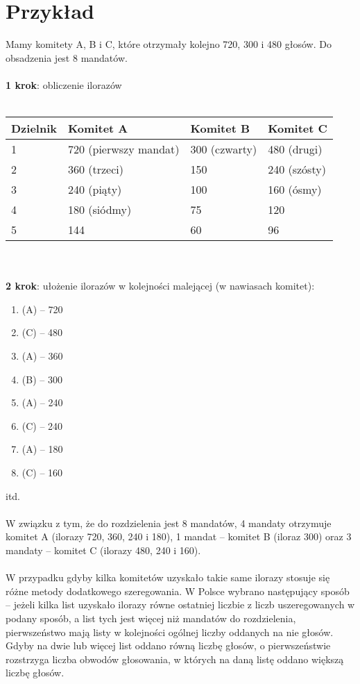 \documentclass[12pt,a4paper,titlepage]{report}
\begin{document}
\section{Przykład}
Mamy komitety A, B i C, które otrzymały kolejno 720, 300 i 480 głosów. Do obsadzenia jest 8 mandatów. \\ \\
\textbf{1 krok}: obliczenie ilorazów \\ \\
\begin{tabular}{|l|l|l|l|} \hline
Dzielnik & Komitet A & Komitet B & Komitet C \\
\hline
1 & 720 (pierwszy mandat) & 300 (czwarty) & 480 (drugi) \\
\hline
2 & 360 (trzeci) & 150 & 240 (szósty) \\
\hline
3 & 240 (piąty) & 100 & 160 (ósmy) \\ 
\hline
4 & 180 (siódmy) & 75 & 120 \\ \hline
5 & 144 & 60 & 96 \\
\hline

\end{tabular}\\ \\
\textbf{2 krok}: ułożenie ilorazów w kolejności malejącej (w nawiasach komitet):
\begin{enumerate}
\item (A) – 720
\item (C) – 480
\item (A) – 360
\item (B) – 300
\item (A) – 240
\item (C) – 240
\item (A) – 180
\item (C) – 160
\end{enumerate} 
itd. \\ \\
W związku z tym, że do rozdzielenia jest 8 mandatów, 4 mandaty otrzymuje komitet A (ilorazy 720, 360, 240 i 180), 1 mandat – komitet B (iloraz 300) oraz 3 mandaty – komitet C (ilorazy 480, 240 i 160). \\ \\
W przypadku gdyby kilka komitetów uzyskało takie same ilorazy stosuje się różne metody dodatkowego szeregowania. W Polsce wybrano następujący sposób – jeżeli kilka list uzyskało ilorazy równe ostatniej liczbie z liczb uszeregowanych w podany sposób, a list tych jest więcej niż mandatów do rozdzielenia, pierwszeństwo mają listy w kolejności ogólnej liczby oddanych na nie głosów. Gdyby na dwie lub więcej list oddano równą liczbę głosów, o pierwszeństwie rozstrzyga liczba obwodów głosowania, w których na daną listę oddano większą liczbę głosów.
\end{document}
